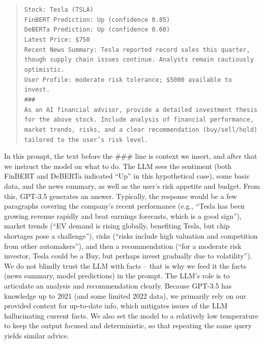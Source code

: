 \documentclass{scrartcl}
\begin{document}
\begin{quote}
\small
\texttt{Stock: Tesla (TSLA)\\
FinBERT Prediction: Up (confidence 0.85)\\
DeBERTa Prediction: Up (confidence 0.60)\\
Latest Price: \$750\\
Recent News Summary: Tesla reported record sales this quarter, though supply chain issues continue. Analysts remain cautiously optimistic.\\
User Profile: moderate risk tolerance; \$5000 available to invest.\\
\#\#\#\\
As an AI financial advisor, provide a detailed investment thesis for the above stock. Include analysis of financial performance, market trends, risks, and a clear recommendation (buy/sell/hold) tailored to the user's risk level.}
\end{quote}

In this prompt, the text before the \#\#\# line is context we insert, and after that we instruct the model on what to do. The LLM sees the sentiment (both FinBERT and DeBERTa indicated “Up” in this hypothetical case), some basic data, and the news summary, as well as the user's risk appetite and budget. From this, GPT-3.5 generates an answer. Typically, the response would be a few paragraphs covering the company's recent performance (e.g., “Tesla has been growing revenue rapidly and beat earnings forecasts, which is a good sign”), market trends (“EV demand is rising globally, benefiting Tesla, but chip shortages pose a challenge”), risks (“risks include high valuation and competition from other automakers”), and then a recommendation (“for a moderate risk investor, Tesla could be a Buy, but perhaps invest gradually due to volatility”). We do not blindly trust the LLM with facts – that is why we feed it the facts (news summary, model predictions) in the prompt. The LLM’s role is to articulate an analysis and recommendation clearly. Because GPT-3.5 has knowledge up to 2021 (and some limited 2022 data), we primarily rely on our provided context for up-to-date info, which mitigates issues of the LLM hallucinating current facts. We also set the model to a relatively low temperature to keep the output focused and deterministic, so that repeating the same query yields similar advice.
\end{document}
